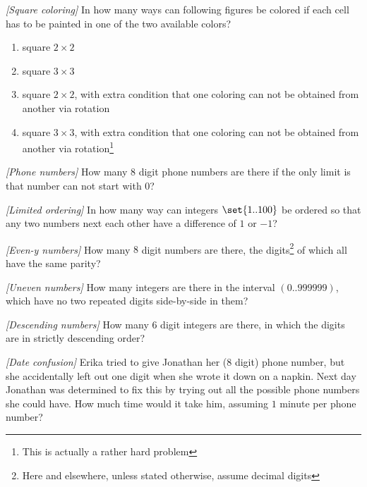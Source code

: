\begin{problem}
\textit{[Square coloring]}
In how many ways can following figures be colored if each cell has to be painted in one of the two available colors?
\begin{enumerate}
\item square $2 \times 2$
\item square $3 \times 3$
\item square $2 \times 2$, with extra condition that one coloring can not be obtained from another via rotation
\item square $3 \times 3$, with extra condition that one coloring can not be obtained from another via rotation\footnote{This is actually a rather hard problem}
\end{enumerate}
\end{problem}
%
\filbreak
\begin{problem}
\textit{[Phone numbers]}
How many $8$ digit phone numbers are there if the only limit is that number can not start with $0$?
\end{problem}
%
\filbreak
\begin{problem}
\textit{[Limited ordering]}
In how many way can integers $\set{1..100}$ be ordered so that any two numbers next each other have a difference of $1$ or $-1$?
\end{problem}
%
\filbreak
\begin{problem}
\textit{[Even-y numbers]}
How many $8$ digit numbers are there, the digits\footnote{Here and elsewhere, unless stated otherwise, assume decimal digits} of which all have the same parity?
\end{problem}
%
\filbreak
\begin{problem}
\textit{[Uneven numbers]}
How many integers are there in the interval $(0..999999)$, which have no two repeated digits side-by-side in them?
\end{problem}
%
\filbreak
\begin{problem}
\textit{[Descending numbers]}
How many $6$ digit integers are there, in which the digits are in strictly descending order?
\end{problem}
%
\filbreak
\begin{problem}
\textit{[Date confusion]}
Erika tried to give Jonathan her ($8$ digit) phone number, but she accidentally left out one digit when she wrote it down on a napkin. Next day Jonathan was determined to fix this by trying out all the possible phone numbers she could have. How much time would it take him, assuming $1$ minute per phone number?
\end{problem}
